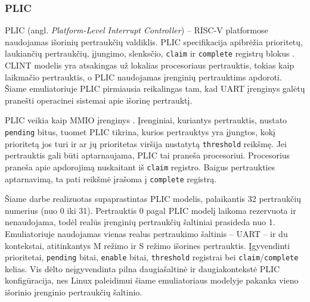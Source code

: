\subsubsection{PLIC}

PLIC (angl. \textit{Platform-Level Interrupt Controller}) -- RISC-V platformose naudojamas išorinių pertraukčių valdiklis. PLIC specifikacija apibrėžia prioritetų, laukiančių pertraukčių, įjungimo, slenksčio, \texttt{claim} ir \texttt{complete} registrų blokus \cite[p.~9]{riscv-plic-1.0.0}. CLINT modelis yra atsakingas už lokalias procesoriaus pertrauktis, tokias kaip laikmačio pertrauktis, o PLIC naudojamas įrenginių pertrauktims apdoroti. Šiame emuliatoriuje PLIC pirmiausia reikalingas tam, kad UART įrenginys galėtų pranešti operacinei sistemai apie išorinę pertrauktį.

PLIC veikia kaip MMIO įrenginys \cite[p.~10--16]{riscv-plic-1.0.0}. Įrenginiai, kuriantys pertrauktis, nustato \texttt{pending} bitus, tuomet PLIC tikrina, kurios pertrauktys yra įjungtos, kokį prioritetą jos turi ir ar jų prioritetas viršija nustatytą \texttt{threshold} reikšmę. Jei pertrauktis gali būti aptarnaujama, PLIC tai praneša procesoriui. Procesorius praneša apie apdorojimą nuskaitant iš \texttt{claim} registro. Baigus pertraukties aptarnavimą, ta pati reikšmė įrašoma į \texttt{complete} registrą.

Šiame darbe realizuotas supaprastintas PLIC modelis, palaikantis 32 pertraukčių numerius (nuo 0 iki 31). Pertrauktis 0 pagal PLIC modelį laikoma rezervuota ir nenaudojama, todėl realūs įrenginių pertraukčių šaltiniai prasideda nuo 1. Emuliatoriuje naudojamas vienas realus pertraukimo šaltinis -- UART -- ir du kontekstai, atitinkantys M režimo ir S režimo išorines pertrauktis. Įgyvendinti prioritetai, \texttt{pending} bitai, \texttt{enable} bitai, \texttt{threshold} registrai bei \texttt{claim}/\texttt{complete} kelias. Vis dėlto neįgyvendinta pilna daugiašaltinė ir daugiakontekstė PLIC konfigūracija, nes Linux paleidimui šiame emuliatoriaus modelyje pakanka vieno išorinio įrenginio pertraukčių šaltinio.

